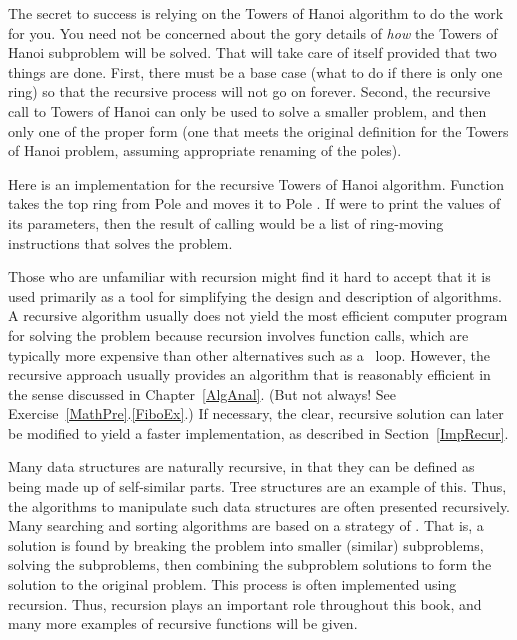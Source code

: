The secret to success is relying on the Towers of Hanoi
algorithm to do the work for you.
You need not be concerned about the gory details of \emph{how} the
Towers of Hanoi subproblem will be solved.
That will take care of itself provided that two things are done.
First, there must be a base case (what to do if there is only one
ring) so that the recursive process will not go on forever.
Second, the recursive call to Towers of Hanoi can only be used to
solve a smaller problem, and then only one of the proper form (one
that meets the original definition for the Towers of Hanoi problem,
assuming appropriate renaming of the poles).

Here is an implementation for the recursive Towers of Hanoi
algorithm.
Function  takes the top ring from Pole
 and moves it to Pole .
If  were to print the values of its parameters,
then the result of calling  would be a list of
ring-moving instructions that solves the problem.




Those who are unfamiliar with recursion might find it hard to
accept that it is used primarily as a tool for simplifying the design
and description of algorithms.
A recursive algorithm usually does not yield the most efficient
computer program for solving the problem because recursion involves
function calls, which are typically more expensive than other
alternatives such as a \Cwhile\ loop.
However, the recursive approach usually provides an algorithm that is
reasonably efficient in the sense discussed in Chapter~\ref{AlgAnal}.
(But not always!  See Exercise~\ref{MathPre}.\ref{FiboEx}.)
If necessary, the clear, recursive solution can later be modified to
yield a faster implementation, as described in Section~\ref{ImpRecur}.

Many data structures are naturally recursive, in that they can be
defined as being made up of self-similar parts.
Tree structures are an example of this.
Thus, the algorithms to manipulate such data structures are often
presented recursively.
Many searching and sorting algorithms are based on a strategy of
.
That is, a solution is found by breaking the problem into smaller
(similar) subproblems, solving the subproblems, then combining the
subproblem solutions to form the solution to the original problem.
This process is often implemented using recursion.
Thus, recursion plays an important role throughout this book, and many 
more examples of recursive functions will be given.

